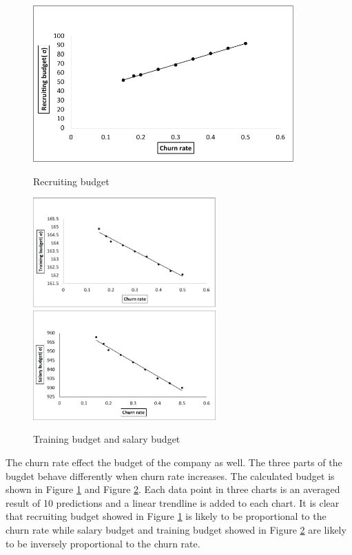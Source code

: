 \documentclass[12pt,a4paper,titlepage]{article}
\begin{document}
\begin{figure}[htb]
  \centering
  \includegraphics[width=10cm]{task4_r.pdf}\\
  \caption{Recruiting budget}\label{t4_r}
\end{figure}
\begin{figure}[htb]
  \centering
  \includegraphics[width=7cm]{task4_t.pdf}
  \includegraphics[width=7cm]{task4_s.pdf}\\
  \caption{Training budget and salary budget}\label{t4_t_s}
\end{figure}
The churn rate effect the budget of the company as well. The three parts of the bugdet behave differently when churn rate increases. The calculated budget is shown in Figure \ref{t4_r} and Figure \ref{t4_t_s}. Each data point in three charts is an averaged result of 10 predictions and a linear trendline is added to each chart. It is clear that recruiting budget showed in Figure \ref{t4_r} is likely to be proportional to the churn rate while salary budget and training budget showed in Figure \ref{t4_t_s} are likely to be inversely proportional to the churn rate.
\end{document}
